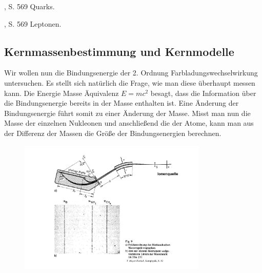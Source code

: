 %
	{\TiplerMPFife, S. 569}%
	{Quarks.}
	
%
	{\TiplerMPFife, S. 569}%
	{Leptonen.}

\subsection{Kernmassenbestimmung und Kernmodelle} 

Wir wollen nun die Bindungsenergie der 2. Ordnung Farbladungswechselwirkung
untersuchen. Es stellt sich natürlich die Frage, wie man diese überhaupt messen
kann. Die Energie Masse Äquivalenz $E=mc^2$ besagt, dass die Information über
die  Bindungsenergie bereits in der Masse enthalten ist. Eine Änderung der
Bindungsenergie führt somit zu einer Änderung der Masse. Misst man nun die
Masse der einzelnen Nukleonen und anschließend die der Atome, kann man aus der
Differenz der Massen die Größe der Bindungsenergien berechnen.

\begin{figure}[!htbp]
	\centering
	\includegraphics[width=0.8\textwidth]{fig/2-Massenspektrograph.pdf}
\end{figure}

